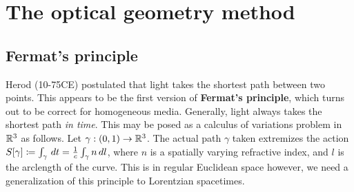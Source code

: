 
\section{The optical geometry method}
\subsection{Fermat's principle}
Herod (10-75CE) postulated that light takes the shortest path between two points.
This appears to be the first version of \textbf{Fermat's principle}, which turns out to be correct for homogeneous media.
Generally, light always takes the shortest path \textit{in time}.
This may be posed as a calculus of variations problem in $\mathbb{R}^3$ as follows.
Let $\gamma: (0,1) \to \mathbb{R}^3$.
The actual path $\gamma$ taken extremizes the action $S[\gamma] \coloneqq \int_{\gamma} \, dt = \frac{1}{c}\int_{\gamma} n \, dl$, where $n$ is a spatially varying refractive index, and $l$ is the arclength of the curve.
This is in regular Euclidean space however, we need a generalization of this principle to Lorentzian spacetimes.
%
%
%
%
